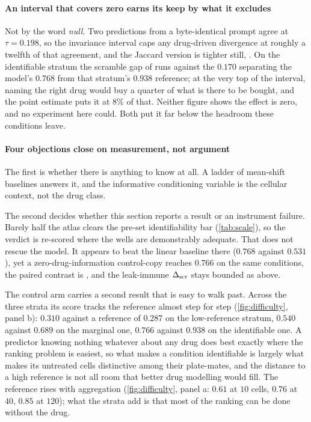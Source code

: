 \paragraph{An interval that covers zero earns its keep by what it excludes} Not
by the word \emph{null}. Two predictions from a byte-identical prompt agree at
$\tau = 0.198$, so the invariance interval caps any drug-driven divergence at
roughly a twelfth of that agreement, and the Jaccard version is tighter still,
. On the identifiable stratum the scramble gap of
 runs against the $0.170$ separating the model's
$0.768$ from that stratum's $0.938$ reference; at the very top of the interval,
naming the right drug would buy a quarter of what is there to be bought, and the
point estimate puts it at $8\%$ of that. Neither figure shows the effect is
zero, and no experiment here could. Both put it far below the headroom these
conditions leave.

\paragraph{Four objections close on measurement, not argument} The first is
whether there is anything to know at all. A ladder of mean-shift baselines
answers it, and the informative conditioning variable is the cellular context,
not the drug class.

The second decides whether this section reports a result or an instrument
failure. Barely half the atlas clears the pre-set identifiability bar
(\cref{tab:scale}), so the verdict is re-scored where the wells are demonstrably
adequate. That does not rescue the model. It appears to beat the linear baseline
there ($0.768$ against $0.531$), yet a zero-drug-information control-copy
reaches $0.766$ on the same conditions, the paired contrast is
, and the leak-immune $\Delta_{\textrm{scr}}$ stays bounded as above.

The control arm carries a second result that is easy to walk past. Across the
three strata its score tracks the reference almost step for step
(\cref{fig:difficulty}, panel b): $0.310$
against a reference of $0.287$ on the low-reference stratum, $0.540$ against
$0.689$ on the marginal one, $0.766$ against $0.938$ on the identifiable one. A
predictor knowing nothing whatever about any drug does best exactly where the
ranking problem is easiest, so what makes a condition identifiable is largely
what makes its untreated cells distinctive among their plate-mates, and the
distance to a high reference is not all room that better drug modelling would
fill. The reference rises with aggregation (\cref{fig:difficulty}, panel a:
$0.61$ at $10$ cells, $0.76$
at $40$, $0.85$ at $120$); what the strata add is that most of the ranking can
be done without the drug.

